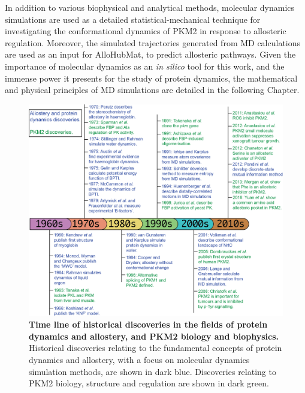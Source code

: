%
%
In addition to various biophysical and analytical methods, molecular dynamics simulations are used as a detailed statistical-mechanical technique for investigating the conformational dynamics of PKM2 in response to allosteric regulation. Moreover, the simulated trajectories generated from MD calculations are used as an input for AlloHubMat, to predict allosteric pathways. Given the importance of molecular dynamics as an \textit{in silico} tool for this work, and the immense power it presents for the study of protein dynamics, the mathematical and physical principles of MD simulations are detailed in the following Chapter. 
%
%
%
\begin{figure}[!ht]
\includegraphics[scale=0.7]{historical_timeline.png}
\caption[Time line of historical discoveries in the fields of protein dynamics and allostery, and PKM2 biology and biophysics.]{\textbf{Time line of historical discoveries in the fields of protein dynamics and allostery, and PKM2 biology and biophysics.} Historical discoveries relating to the fundamental concepts of protein dynamics and allostery, with a focus on molecular dynamics simulation methods, are shown in dark blue. Discoveries relating to PKM2 biology, structure and regulation are shown in dark green. }
\label{fig:timeline}
\end{figure}
%
%
\clearpage





















  

